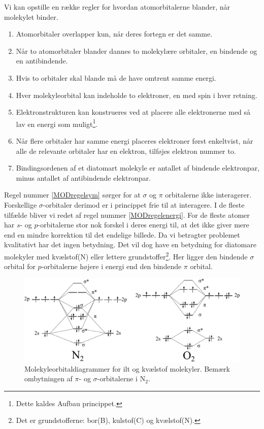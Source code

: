 \documentclass[../../Atom-ogMolekylefysik.tex]{subfiles}
\begin{document}
Vi kan opstille en række regler for hvordan atomorbitalerne blander, når molekylet binder.
\begin{enumerate}
    \item Atomorbitaler overlapper kun, når deres fortegn er det samme.\label{MODregelsym}
    \item Når to atomorbitaler blander dannes to molekylære orbitaler, en bindende og en antibindende.
    \item Hvis to orbitaler skal blande må de have omtrent samme energi.\label{MODregelenergi}
    \item Hver molekyleorbital kan indeholde to elektroner, en med spin i hver retning.
    \item Elektronstrukturen kan konstrueres ved at placere alle elektronerne med så lav en energi som muligt\footnote{Dette kaldes Aufbau princippet.}.
    \item Når flere orbitaler har samme energi placeres elektroner først enkeltvist, når alle de relevante orbitaler har en elektron, tilføjes elektron nummer to.
    \item Bindingsordenen af et diatomart molekyle er antallet af bindende elektronpar, minus antallet af antibindende elektronpar.
\end{enumerate}
Regel nummer \ref{MODregelsym} sørger for at $\sigma$ og $\pi$ orbitalerne ikke interagerer. Forskellige $\sigma$-orbitaler derimod er i princippet frie til at interagere. I de fleste tilfælde bliver vi redet af regel nummer \ref{MODregelenergi}. For de fleste atomer har $s$- og $p$-orbitalerne stor nok forskel i deres energi til, at det ikke giver mere end en mindre korrektion til det endelige billede. Da vi betragter problemet kvalitativt har det ingen betydning. Det vil dog have en betydning for diatomare molekyler med kvælstof(N) eller lettere grundstoffer\footnote{Det er grundstofferne: bor(B), kulstof(C) og kvælstof(N).}. Her ligger den bindende $\sigma$ orbital for $p$-orbitalerne højere i energi end den bindende $\pi$ orbital.
\begin{figure}[h!]
    \centering
    \includegraphics[width = \textwidth]{Atom-ogMolekylefysik/billeder/diatomarMOD.pdf}
    \caption{Molekyleorbitaldiagrammer for ilt og kvælstof molekyler. Bemærk ombytningen af $\pi$- og $\sigma$-orbitalerne i N$_2$.}
    \label{fig:diatomar}
\end{figure}
\end{document}
